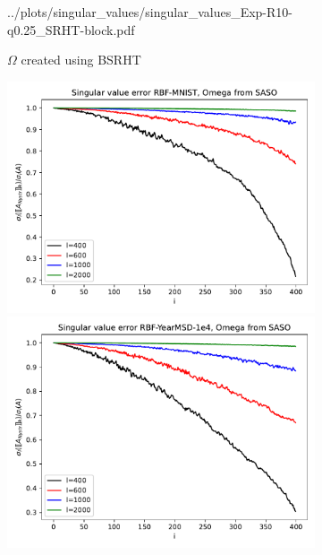\documentclass{article}
\theoremstyle{definition}
\begin{document}
\begin{figure}
\begin{subfigure}[t]{\textwidth+20pt\relax}
        {../plots/singular_values/singular_values_Exp-R10-q0.25_SRHT-block.pdf}
    \caption{$\Omega$ created using BSRHT}
\end{subfigure}\hfill
\begin{subfigure}[t]{0.4\textwidth}
    \includegraphics[width=\textwidth]
        {../plots/singular_values/singular_values_RBF-MNIST_SASO.pdf}
    \includegraphics[width=\textwidth]
        {../plots/singular_values/singular_values_RBF-YearMSD-1e4_SASO.pdf}

\end{subfigure}
\end{figure}
\end{document}
